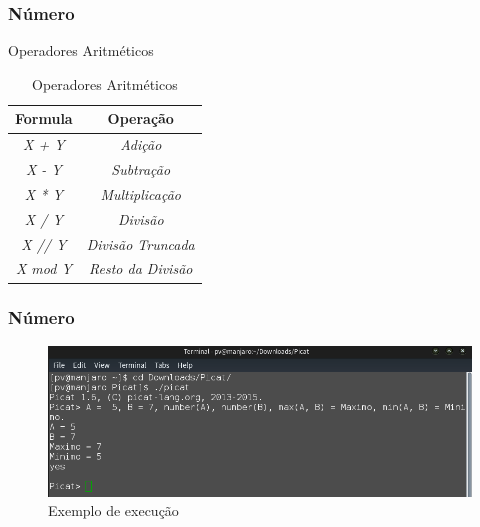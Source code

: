 \documentclass[sans]{beamer}
\begin{document}

\begin{frame}[fragile]   %
\frametitle{Número}
\begin{block}{Operadores Aritméticos}

\begin{table}[!ht]
\centering
\caption{Operadores Aritméticos}
\begin{tabular}{c|c}\hline \hline
\textbf{Formula}	&  \textbf{Operação}\\ \hline \hline
	    
\textit{X + Y}	&  \textit{Adição}\\ \hline 
\textit{X - Y}	&  \textit{Subtração}\\ \hline 
\textit{X * Y}	&  \textit{Multiplicação}\\ \hline 
\textit{X / Y}	&  \textit{Divisão}\\ \hline 
\textit{X // Y}	&  \textit{Divisão Truncada}\\ \hline 
\textit{X mod Y}	&  \textit{Resto da Divisão}\\ \hline
\hline

\end{tabular} 
\label{tab2}
\end{table}

\end{block}
\end{frame}


\begin{frame}[fragile]   %
\frametitle{Número}

 \begin{figure}[!ht]
 \centering
 \includegraphics[width=.9\textwidth]{picatnumeros.png}
 \caption{Exemplo de execução}
 \end{figure}

\end{frame}
\end{document}
